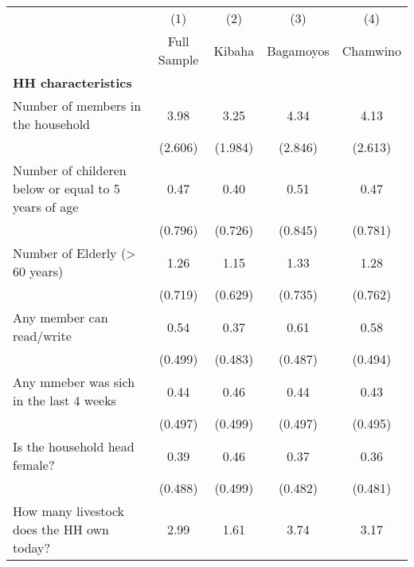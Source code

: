 {
\def\sym#1{\ifmmode^{#1}\else\(^{#1}\)\fi}
\begin{tabular}{l*{4}{c}}
\hline\hline
                    &\multicolumn{1}{c}{(1)}&\multicolumn{1}{c}{(2)}&\multicolumn{1}{c}{(3)}&\multicolumn{1}{c}{(4)}\\
                    &\multicolumn{1}{c}{Full Sample}&\multicolumn{1}{c}{ Kibaha}&\multicolumn{1}{c}{Bagamoyos}&\multicolumn{1}{c}{Chamwino}\\
\hline
\textbf{HH characteristics}&                     &                     &                     &                     \\
[1em]
Number of members in the household&        3.98         &        3.25         &        4.34         &        4.13         \\
                    &     (2.606)         &     (1.984)         &     (2.846)         &     (2.613)         \\
[1em]
Number of childeren below or equal to 5 years of age&        0.47         &        0.40         &        0.51         &        0.47         \\
                    &     (0.796)         &     (0.726)         &     (0.845)         &     (0.781)         \\
[1em]
Number of Elderly (> 60 years)&        1.26         &        1.15         &        1.33         &        1.28         \\
                    &     (0.719)         &     (0.629)         &     (0.735)         &     (0.762)         \\
[1em]
Any member can read/write&        0.54         &        0.37         &        0.61         &        0.58         \\
                    &     (0.499)         &     (0.483)         &     (0.487)         &     (0.494)         \\
[1em]
Any mmeber was sich in the last 4 weeks&        0.44         &        0.46         &        0.44         &        0.43         \\
                    &     (0.497)         &     (0.499)         &     (0.497)         &     (0.495)         \\
[1em]
Is the household head female?&        0.39         &        0.46         &        0.37         &        0.36         \\
                    &     (0.488)         &     (0.499)         &     (0.482)         &     (0.481)         \\
[1em]
How many livestock does the HH own today?&        2.99         &        1.61         &        3.74         &        3.17         \\

\end{tabular}}
